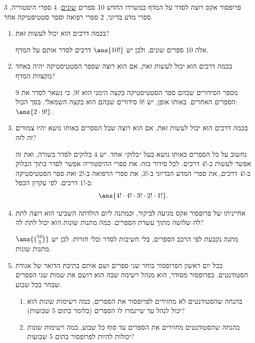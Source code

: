 פרופסור אקס רוצה לסדר על המדף במשרדו החדש 10 ספרים \underline{שונים}: 4 ספרי היסטוריה, 3 ספרי מדע בדיוני, 2 ספרי רפואה וספר סטטיסטיקה אחד.
\begin{enumerate}
\item בכמה דרכים הוא יכול לעשות זאת?
\begin{solbox}
אלה 10 ספרים שונים, ולכן יש $\ans{10!}$ דרכים לסדר אותם על המדף.
\end{solbox}
\item בכמה דרכים הוא יכול לעשות זאת, אם הוא רוצה שספר הסטטיסטיקה יהיה באחד מקצוות המדף?
\begin{solbox}
מספר הסידורים שבהם ספר הסטטיסטיקה בקצה הימני הוא $9!$, כי נשאר לסדר את 9 הספרים האחרים. באותו אופן, יש $9!$ סידורים שבהם הוא בקצה השמאלי. בסך הכול: $\ans{2\cdot9!}$.
\end{solbox}
\item בכמה דרכים הוא יכול לעשות זאת, אם הוא רוצה שכל הספרים באותו נושא יהיו צמודים זה לזה?
\begin{solbox}
נחשוב על כל הספרים באותו נושא כעל ״בלוק״ אחד. יש 4 בלוקים לסדר בשורה, ואת זה אפשר לעשות ב-$4!$ דרכים. לכל סידור כזה: את ספרי ההיסטוריה אפשר לסדר בתוך הבלוק ב-$4!$ דרכים, את ספרי המדע הבדיוני ב-$3!$, את ספרי הרפואה ב-$2!$ ואת ספר הסטטיסטיקה ב-$1!$ דרכים. לפי עקרון הכפל:
\[
\ans{4!\cdot4!\cdot3!\cdot2!\cdot1!}.
\]
\end{solbox}
\item אחייניתו של פרופסור אקס מגיעה לביקור, וכמתנה ליום הולדתה השביעי הוא רוצה לתת לה שלושה מתוך עשרת הספרים. כמה מתנות שונות הוא יכול לתת לה?
\begin{solbox}
מתנה נקבעת לפי הרכב הספרים, בלי חשיבות לסדר ובלי חזרות. לכן יש $\ans{\binom{10}3}$ מתנות שונות.
\end{solbox}
\item בכל יום ראשון הפרופסור בוחר שני ספרים ושם אותם בתיבת הדואר של אגודת הסטודנטים. כפרופסור מסודר, הוא מנהל רשימה שבה הוא רושם את שמות שני הספרים שבחר בכל שבוע.
\begin{enumerate}
\item בהנחה שהסטודנטים לא מחזירים לפרופסור את הספרים, כמה רשימות שונות הוא יכול לנהל עד שייגמרו לו הספרים (כלומר בתום 5 שבועות)?
\item בהנחה שהסטודנטים מחזירים את הספרים עד סוף כל שבוע, כמה רשימות שונות יכולות להיות לפרופסור בתום 5 שבועות?

\end{enumerate}
\end{enumerate}
